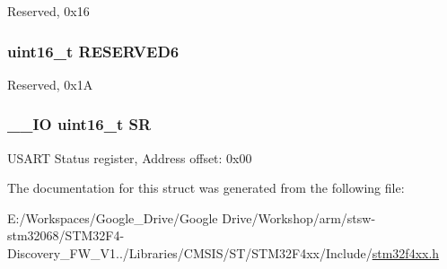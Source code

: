 Reserved, 0x16 \hypertarget{struct_u_s_a_r_t___type_def_aab502dde158ab7da8e7823d1f8a06edb}{
\subsubsection[{R\-E\-S\-E\-R\-V\-E\-D6}]{\setlength{\rightskip}{0pt plus 5cm}uint16\-\_\-t R\-E\-S\-E\-R\-V\-E\-D6}}\label{struct_u_s_a_r_t___type_def_aab502dde158ab7da8e7823d1f8a06edb}
Reserved, 0x1\-A \hypertarget{struct_u_s_a_r_t___type_def_a44962ea5442d203bf4954035d1bfeb9d}{
\subsubsection[{S\-R}]{\setlength{\rightskip}{0pt plus 5cm}\-\_\-\-\_\-\-I\-O uint16\-\_\-t S\-R}}\label{struct_u_s_a_r_t___type_def_a44962ea5442d203bf4954035d1bfeb9d}
U\-S\-A\-R\-T Status register, Address offset\-: 0x00 

The documentation for this struct was generated from the following file\-:\begin{DoxyCompactItemize}
\item 
E\-:/\-Workspaces/\-Google\-\_\-\-Drive/\-Google Drive/\-Workshop/arm/stsw-\/stm32068/\-S\-T\-M32\-F4-\/\-Discovery\-\_\-\-F\-W\-\_\-\-V1../\-Libraries/\-C\-M\-S\-I\-S/\-S\-T/\-S\-T\-M32\-F4xx/\-Include/\hyperlink{stm32f4xx_8h}{stm32f4xx.\-h}\end{DoxyCompactItemize}
